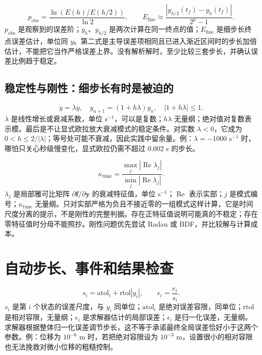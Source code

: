 \begin{equation}
p_{\mathrm{obs}}=\frac{\ln(E(h)/E(h/2))}{\ln 2},\qquad
E_{\mathrm{fine}}\approx\frac{|y_{h/2}(t_f)-y_h(t_f)|}{2^p-1}.
\end{equation}
$p_{\mathrm{obs}}$ 是观察到的误差阶；$y_h$、$y_{h/2}$ 是两次计算在同一终点的值；$E_{\mathrm{fine}}$ 是细步长终点误差估计，单位同 $y$。第二式是主导误差项相同且已进入渐近区间时的步长加倍估计，不能把它当作严格误差上界。没有解析解时，至少比较三套步长，并确认误差比例趋于稳定。

\subsection{稳定性与刚性：细步长有时是被迫的}
\begin{equation}
\dot y=\lambda y,\quad y_{n+1}=(1+h\lambda)y_n,
\quad |1+h\lambda|\leq1.
\end{equation}
$\lambda$ 是线性增长或衰减系数，单位 s$^{-1}$，可以是复数；$h\lambda$ 无量纲；绝对值对复数表示模。最后是不让显式欧拉放大衰减模式的稳定条件。对实数 $\lambda<0$，它成为 $0<h\leq 2/|\lambda|$；等号处可能不衰减，因此实践中留余量。例：$\lambda=-1000$ s$^{-1}$ 时，哪怕只关心秒级慢变化，显式欧拉仍需不超过 0.002 s 的步长。

\begin{equation}
\kappa_{\mathrm{time}}=\frac{\max_j |\operatorname{Re}\lambda_j|}{\min_j |\operatorname{Re}\lambda_j|}.
\end{equation}
$\lambda_j$ 是局部雅可比矩阵 $\partial\boldsymbol f/\partial\boldsymbol y$ 的衰减特征值，单位 s$^{-1}$；$\operatorname{Re}$ 表示实部；$j$ 是模式编号；$\kappa_{\mathrm{time}}$ 无量纲。只对实部严格为负且不接近零的一组模式这样计算，它是时间尺度分离的提示，不是刚性的完整判据。存在正特征值说明可能真的不稳定；存在零特征值时分母不能照抄。刚性问题优先尝试 Radau 或 BDF，并比较解与计算成本。

\section{自动步长、事件和结果检查}
\begin{equation}
s_i=\mathrm{atol}_i+\mathrm{rtol}|y_i|,\qquad
\epsilon_i=\frac{e_i}{s_i}.
\end{equation}
$s_i$ 是第 $i$ 个状态的误差尺度，与 $y_i$ 同单位；$\mathrm{atol}_i$ 是绝对误差容限，同单位；$\mathrm{rtol}$ 是相对容限，无量纲；$e_i$ 是求解器估计的局部误差；$\epsilon_i$ 是归一化误差，无量纲。求解器根据整体归一化误差调节步长，这不等于承诺最终全局误差恰好小于这两个参数。例：位移为 $10^{-6}$ m 时，若把绝对容限设为 $10^{-3}$ m，设置很小的相对容限也无法挽救对微小位移的粗糙控制。

